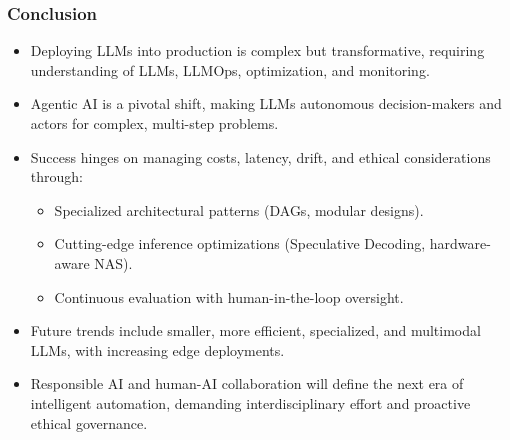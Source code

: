 \documentclass{beamer}       %
\begin{document}
\begin{frame}
    \frametitle{Conclusion}
    \begin{itemize}
        \item Deploying LLMs into production is complex but transformative, requiring understanding of LLMs, LLMOps, optimization, and monitoring.
        \item Agentic AI is a pivotal shift, making LLMs autonomous decision-makers and actors for complex, multi-step problems.
        \item Success hinges on managing costs, latency, drift, and ethical considerations through:
        \begin{itemize}
            \item Specialized architectural patterns (DAGs, modular designs).
            \item Cutting-edge inference optimizations (Speculative Decoding, hardware-aware NAS).
            \item Continuous evaluation with human-in-the-loop oversight.
        \end{itemize}
        \item Future trends include smaller, more efficient, specialized, and multimodal LLMs, with increasing edge deployments.
        \item Responsible AI and human-AI collaboration will define the next era of intelligent automation, demanding interdisciplinary effort and proactive ethical governance.
    \end{itemize}
\end{frame}
\end{document}
